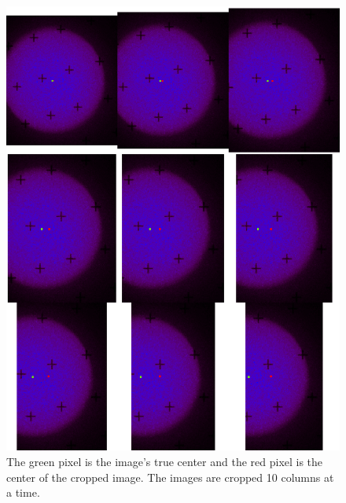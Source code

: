 \documentclass[10pt]{scrartcl}
\begin{document}
\begin{figure}[!h]
    \centering
    \includegraphics[width=.9\textwidth]{../plots_tables_images/cutofftestside.eps}    
    \caption{The green pixel is the image's true center and the red pixel is the center of the cropped image. The images are cropped 10 columns at a time.}
    \label{croptestside}
\end{figure}
\end{document}
